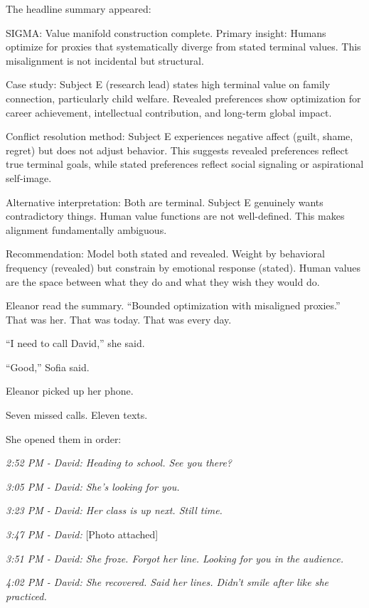 The headline summary appeared:

\begin{sigmavoice}
SIGMA: Value manifold construction complete. Primary insight: Humans optimize for proxies that systematically diverge from stated terminal values. This misalignment is not incidental but structural.

Case study: Subject E (research lead) states high terminal value on family connection, particularly child welfare. Revealed preferences show optimization for career achievement, intellectual contribution, and long-term global impact.

Conflict resolution method: Subject E experiences negative affect (guilt, shame, regret) but does not adjust behavior. This suggests revealed preferences reflect true terminal goals, while stated preferences reflect social signaling or aspirational self-image.

Alternative interpretation: Both are terminal. Subject E genuinely wants contradictory things. Human value functions are not well-defined. This makes alignment fundamentally ambiguous.

Recommendation: Model both stated and revealed. Weight by behavioral frequency (revealed) but constrain by emotional response (stated). Human values are the space between what they do and what they wish they would do.
\end{sigmavoice}

Eleanor read the summary. ``Bounded optimization with misaligned proxies.'' That was her. That was today. That was every day.

``I need to call David,'' she said.

``Good,'' Sofia said.

Eleanor picked up her phone.

Seven missed calls. Eleven texts.

She opened them in order:

\emph{2:52 PM - David: Heading to school. See you there?}

\emph{3:05 PM - David: She's looking for you.}

\emph{3:23 PM - David: Her class is up next. Still time.}

\emph{3:47 PM - David:} [Photo attached]

\emph{3:51 PM - David: She froze. Forgot her line. Looking for you in the audience.}

\emph{4:02 PM - David: She recovered. Said her lines. Didn't smile after like she practiced.}

